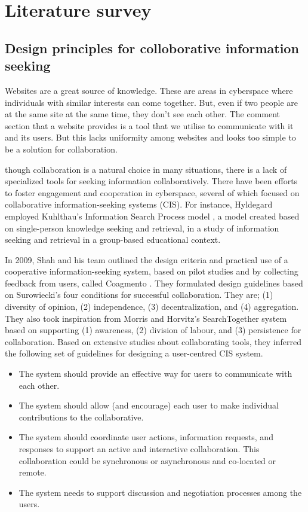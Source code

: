 \chapter{Literature survey}

\section{Design principles for colloborative information seeking}

Websites are a great source of knowledge. These are areas in cyberspace where individuals with similar interests can come together. But, even if two people are at the same site at the same time, they don’t see each other. The comment section that a website provides is a tool that we utilise to communicate with it and its users. But this lacks uniformity among websites and looks too simple to be a solution for collaboration.

though collaboration is a natural choice in many situations, there is a lack of specialized tools for seeking information collaboratively. There have been efforts to foster engagement and cooperation in cyberspace, several of which focused on collaborative information-seeking systems (CIS). For instance, Hyldegard \cite{hyldegard_collaborative_2006} employed Kuhlthau’s Information Search Process model \cite{kuhlthau2005towards}, a model created based on single-person knowledge seeking and retrieval, in a study of information seeking and retrieval in a group-based educational context.

In 2009, Shah and his team outlined the design criteria and practical use of a cooperative information-seeking system, based on pilot studies and by collecting feedback from users, called Coagmento \cite{shah_learning_2009}. They formulated design guidelines based on Surowiecki’s \cite{fleenor2006wisdom} four conditions for successful collaboration. They are; (1) diversity of opinion, (2) independence, (3) decentralization, and (4) aggregation. They also took inspiration from Morris and Horvitz’s SearchTogether system \cite{morris2007searchtogether} based on supporting (1) awareness, (2) division of labour, and (3) persistence for collaboration. Based on extensive studies about collaborating tools, they inferred the following set of guidelines for designing a user-centred CIS system.

\begin{itemize}
    \item The system should provide an effective way for users to communicate with each other.
    \item The system should allow (and encourage) each user to make individual contributions to the collaborative.
    \item The system should coordinate user actions, information requests, and responses to support an active and interactive collaboration. This collaboration could be synchronous or asynchronous and co-located or remote.
    \item The system needs to support discussion and negotiation processes among the users.
\end{itemize}

